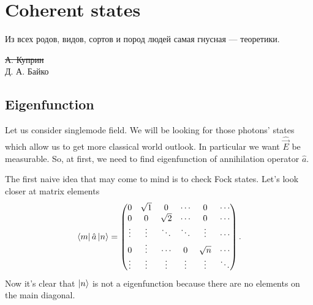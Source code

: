 \section{Coherent states}

\begin{otherlanguage}{russian}
	\epigraph{Из всех родов, видов, сортов и пород людей самая гнусная --- теоретики.}{\sout{А. Куприн} \\Д. А. Байко}
\end{otherlanguage}

\subsection{Eigenfunction}

Let us consider singlemode field.
We will be looking for those photons' states which allow us to get more classical world outlook. In particular we want $\hat{\vec{E}}$ be measurable. So, at first, we need to find eigenfunction of annihilation operator $\hat{a}$.

The first naive idea that may come to mind is to check Fock states. Let's look closer at matrix elements
\begin{equation}
	\left\langle {m} \right\rvert \hat{a} \left\lvert {n} \right\rangle =
	\begin{pmatrix}
		0 & \sqrt{1} & 0 &  \cdots  & 0 & \cdots \\
		0 & 0 & \sqrt{2} &  \cdots & 0 & \cdots \\
		\vdots & \vdots & \ddots & \ddots & \vdots  & \cdots \\
		0 & \vdots & \cdots & 0 & \sqrt{n} & \cdots \\
		\vdots & \vdots & \vdots & \vdots & \vdots & \ddots\\
	\end{pmatrix}.
\end{equation}
Now it's clear that $\left\lvert {n} \right\rangle$ is not a eigenfunction because there are no elements on the main diagonal.

